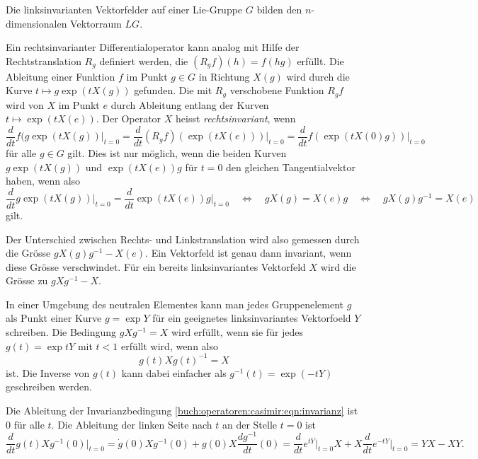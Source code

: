 \begin{definition}
Die linksinvarianten Vektorfelder auf einer Lie-Gruppe $G$ bilden 
den $n$-dimensionalen Vektorraum $LG$.
\end{definition}

Ein rechtsinvarianter Differentialoperator kann analog mit Hilfe
der Rechtstranslation $R_g$ definiert werden, die $(R_gf)(h) = f(hg)$
erfüllt.
Die Ableitung einer Funktion $f$ im Punkt $g\in G$ in Richtung $X(g)$
wird durch die Kurve $t\mapsto g\exp(tX(g))$ gefunden.
Die mit $R_g$ verschobene Funktion $R_gf$ wird von $X$ im Punkt $e$
durch Ableitung entlang der Kurven $t\mapsto \exp(tX(e))$.
Der Operator $X$ heisst {\em rechtsinvariant}, wenn 
\[
\frac{d}{dt} f(g\exp(tX(g))\bigg|_{t=0}
=
\frac{d}{dt} (R_gf)(\exp(tX(e)))\bigg|_{t=0}
=
\frac{d}{dt} f(\exp(tX(0)g))\bigg|_{t=0}
\]
für alle $g\in G$ gilt.
Dies ist nur möglich, wenn die beiden Kurven
$g\exp(tX(g))$
und 
$\exp(tX(e))g$
für $t=0$ den gleichen Tangentialvektor haben, wenn also
\[
\frac{d}{dt}g\exp(tX(g))\bigg|_{t=0}
=
\frac{d}{dt}\exp(tX(e))g\bigg|_{t=0}
\quad\Leftrightarrow\quad
gX(g) = X(e)g
\quad\Leftrightarrow\quad
gX(g)g^{-1} = X(e)
\]
gilt.

Der Unterschied zwischen Rechts- und Linkstranslation wird also gemessen
durch die Grösse $gX(g)g^{-1}-X(e)$.
Ein Vektorfeld ist genau dann invariant, wenn diese Grösse verschwindet.
Für ein bereits linksinvariantes Vektorfeld $X$ wird die Grösse zu
$gXg^{-1}-X$.

In einer Umgebung des neutralen Elementes kann man jedes Gruppenelement
$g$ als Punkt einer Kurve $g=\exp Y$ für ein geeignetes linksinvariantes
Vektorfoeld $Y$ schreiben.
Die Bedingung $gXg^{-1}=X$ wird erfüllt, wenn sie für jedes $g(t)=\exp tY$
mit $t<1$ erfüllt wird, wenn also
\begin{equation}
g(t)Xg(t)^{-1}=X
\label{buch:operatoren:casimir:eqn:invarianz}
\end{equation}
ist.
Die Inverse von $g(t)$ kann dabei einfacher als $g^{-1}(t)=\exp(-tY)$
geschreiben werden.

Die Ableitung der Invarianzbedingung
\eqref{buch:operatoren:casimir:eqn:invarianz}
ist $0$ für alle $t$.
Die Ableitung der linken Seite nach $t$ an der Stelle $t=0$ ist
\begin{equation}
\frac{d}{dt} g(t)Xg^{-1}(0)\bigg|_{t=0}
=
\dot{g}(0)Xg^{-1}(0)
+
g(0) X \frac{dg^{-1}}{dt}(0)
=
\frac{d}{dt}e^{tY}\bigg|_{t=0}
X
+
X
\frac{d}{dt}e^{-tY}\bigg|_{t=0}
=
YX-XY.
\label{buch:operatoren:casimir:eqn:innad}
\end{equation}

